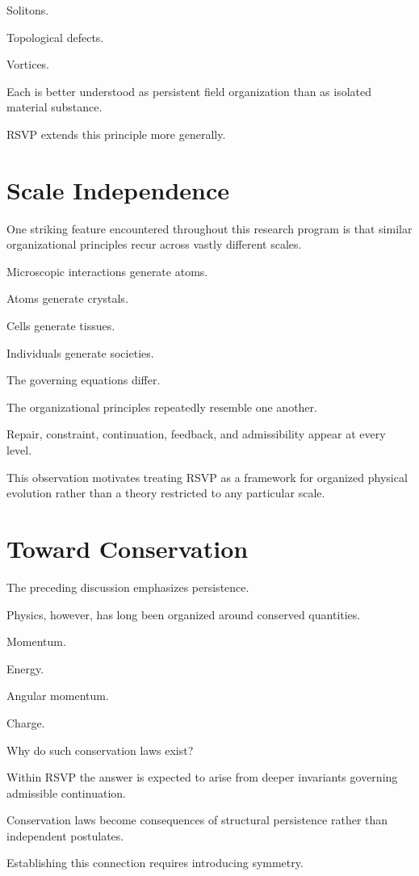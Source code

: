 \documentclass[11pt,oneside]{book}
\numberwithin{equation}{chapter}
\theoremstyle{definition}
\theoremstyle{plain}
\begin{document}
Solitons.

Topological defects.

Vortices.

Each is better understood as persistent field organization than as isolated
material substance.

RSVP extends this principle more generally.

\section{Scale Independence}

One striking feature encountered throughout this research program is that
similar organizational principles recur across vastly different scales.

Microscopic interactions generate atoms.

Atoms generate crystals.

Cells generate tissues.

Individuals generate societies.

The governing equations differ.

The organizational principles repeatedly resemble one another.

Repair, constraint, continuation, feedback, and admissibility appear at
every level.

This observation motivates treating RSVP as a framework for organized
physical evolution rather than a theory restricted to any particular scale.

\section{Toward Conservation}

The preceding discussion emphasizes persistence.

Physics, however, has long been organized around conserved quantities.

Momentum.

Energy.

Angular momentum.

Charge.

Why do such conservation laws exist?

Within RSVP the answer is expected to arise from deeper invariants governing
admissible continuation.

Conservation laws become consequences of structural persistence rather than
independent postulates.

Establishing this connection requires introducing symmetry.
\end{document}
